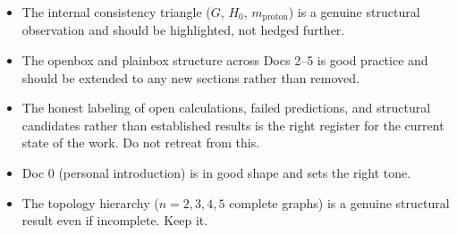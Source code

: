 \documentclass[11pt,letterpaper]{article}
\begin{document}
\begin{itemize}
\item The internal consistency triangle (\(G\), \(H_0\), \(m_\text{proton}\)) is a
genuine structural observation and should be highlighted, not hedged further.
\item The openbox and plainbox structure across Docs 2--5 is good practice and
should be extended to any new sections rather than removed.
\item The honest labeling of open calculations, failed predictions, and structural
candidates rather than established results is the right register for the
current state of the work. Do not retreat from this.
\item Doc 0 (personal introduction) is in good shape and sets the right tone.
\item The topology hierarchy (\(n=2,3,4,5\) complete graphs) is a genuine structural
result even if incomplete. Keep it.
\end{itemize}
\end{document}
